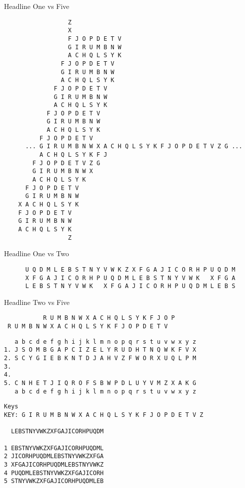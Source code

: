 \documentclass[11pt,a4paper,twoside]{article}
\begin{document}
Headline One vs Five

\begin{lstlisting}
                  Z
                  X
                  F J O P D E T V 
                  G I R U M B N W  
                  A C H Q L S Y K 
                F J O P D E T V 
                G I R U M B N W  
                A C H Q L S Y K 
              F J O P D E T V 
              G I R U M B N W
              A C H Q L S Y K
            F J O P D E T V 
            G I R U M B N W 
            A C H Q L S Y K 
          F J O P D E T V  
      ... G I R U M B N W X A C H Q L S Y K F J O P D E T V Z G ...
          A C H Q L S Y K F J
        F J O P D E T V Z G    
        G I R U M B N W X 
        A C H Q L S Y K
      F J O P D E T V 
      G I R U M B N W  
    X A C H Q L S Y K
    F J O P D E T V 
    G I R U M B N W  
    A C H Q L S Y K
                  Z
\end{lstlisting}

Headline One vs Two
        
\begin{lstlisting}
      U Q D M L E B S T N Y V W K Z X F G A J I C O R H P U Q D M
      X F G A J I C O R H P U Q D M L E B S T N Y V W K   X F G A 
      L E B S T N Y V W K   X F G A J I C O R H P U Q D M L E B S       
\end{lstlisting}

Headline Two vs Five 

\begin{lstlisting}
           R U M B N W X A C H Q L S Y K F J O P 
 R U M B N W X A C H Q L S Y K F J O P D E T V 
\end{lstlisting}


\begin{lstlisting}
   a b c d e f g h i j k l m n o p q r s t u v w x y z
1. J S O M B G A P C I Z E L Y R U D H T N Q W K F V X 
2. S C Y G I E B K N T D J A H V Z F W O R X U Q L P M 
3.                                                     
4.                                                     
5. C N H E T J I Q R O F S B W P D L U Y V M Z X A K G 
   a b c d e f g h i j k l m n o p q r s t u v w x y z
\end{lstlisting}


\begin{lstlisting}
Keys 
KEY: G I R U M B N W X A C H Q L S Y K F J O P D E T V Z

  LEBSTNYVWKZXFGAJICORHPUQDM

1 EBSTNYVWKZXFGAJICORHPUQDML
2 JICORHPUQDMLEBSTNYVWKZXFGA
3 XFGAJICORHPUQDMLEBSTNYVWKZ
4 PUQDMLEBSTNYVWKZXFGAJICORH
5 STNYVWKZXFGAJICORHPUQDMLEB
\end{lstlisting}
\end{document}
